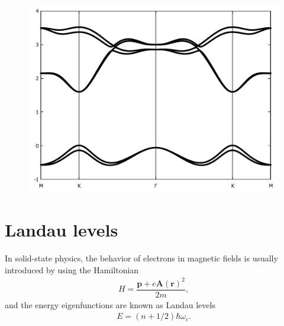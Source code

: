 \documentclass{report}
\newcommand{\f}[2]{\dfrac{#1}{#2}}
\begin{document}
\begin{figure}[htb]
	\centering
	\includegraphics[width=0.65\linewidth,height=0.5\linewidth]{pic/bandstructureSOC.pdf}
	\caption{\label{band structure SOC}}
\end{figure}


\section{Landau levels}
In solid-state physics, the behavior of electrons in magnetic fields is usually introduced by using the Hamiltonian
\begin{gather}
	H = \f{\mathbf{p} + e \mathbf{A}(\mathbf{r})^{2}}{2m} ,
\end{gather}
and the energy eigenfunctions are known as Landau levels
\begin{gather}
	E = \left(n + 1/2\right) \hbar \omega_{c}.
\end{gather}
\end{document}
